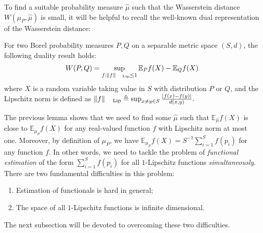 \documentclass[final,12pt]{colt2018} %
\def \bE {\mathbb{E}}
\begin{document}
To find a suitable probability measure $\hat{\mu}$ such that the Wasserstein distance $W(\mu_P,\hat{\mu})$ is small, it will be helpful to recall the well-known dual representation of the Wasserstein distance:
\begin{lemma}\cite{kantorovich1958space}\label{lemma.dual}
	For two Borel probability measures $P,Q$ on a separable metric space $(S,d)$, the following duality result holds:
	\begin{align*}
	W(P,Q) = \sup_{f: \lVert f \rVert_{\text{\rm Lip}}\le 1} \bE_P f(X) - \bE_Q f(X)
	\end{align*}
	where $X$ is a random variable taking value in $S$ with distribution $P$ or $Q$, and the Lipschitz norm is defined as
$
	\lVert f\rVert_{\text{\rm Lip}} \triangleq \sup_{x\neq y\in S}\frac{|f(x)-f(y)|}{d(x,y)}.
$
\end{lemma}

The previous lemma shows that we need to find some $\hat{\mu}$ such that $\bE_{\hat{\mu}}f(X)$ is close to $\bE_{\mu_P}f(X)$ for any real-valued function $f$ with Lipschitz norm at most one. Moreover, by definition of $\mu_P$, we have
$
\bE_{\mu_P}f(X) = S^{-1}\sum_{i=1}^S f(p_i)
$
for any function $f$. In other words, we need to tackle the problem of \emph{functional estimation} of the form $\sum_{i=1}^S f(p_i)$ for all $1$-Lipschitz functions \emph{simultaneously}. There are two fundamental difficulties in this problem:
\begin{enumerate}
	\item Estimation of functionals is hard in general;
	\item The space of all $1$-Lipschitz functions is infinite dimensional. 
\end{enumerate} 

The next subsection will be devoted to overcoming these two difficulties.
\end{document}
